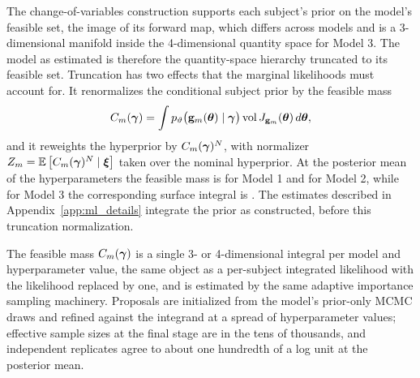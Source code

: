 The change-of-variables construction supports each subject's prior on
the model's feasible set, the image of its forward map, which differs
across models and is a 3-dimensional manifold inside the 4-dimensional
quantity space for Model 3. The model as estimated is therefore the
quantity-space hierarchy truncated to its feasible set. Truncation has
two effects that the marginal likelihoods must account for. It
renormalizes the conditional subject prior by the feasible mass
\begin{equation}
  \label{eq:feasible_mass}
  C_m(\boldsymbol{\gamma}) = \int p_{\vartheta}\big(\mathbf{g}_m(\boldsymbol{\theta}) \mid \boldsymbol{\gamma}\big)\,
    \mathrm{vol}\, J_{\mathbf{g}_m}(\boldsymbol{\theta})\, d\boldsymbol{\theta},
\end{equation}
and it reweights the hyperprior by $C_m(\boldsymbol{\gamma})^N$, with normalizer
$Z_m = \mathbb{E}\left[C_m(\boldsymbol{\gamma})^N \mid \boldsymbol{\xi}\right]$ taken over the nominal
hyperprior. At the posterior mean of the hyperparameters the feasible
mass is  for Model 1 and
 for Model 2, while for
Model 3 the corresponding surface integral is
. The estimates described
in Appendix~\ref{app:ml_details} integrate the prior as constructed,
before this truncation normalization.

The feasible mass $C_m(\boldsymbol{\gamma})$ is a
single 3- or 4-dimensional integral per model and hyperparameter value,
the same object as a per-subject integrated likelihood with the
likelihood replaced by one, and is estimated by the same adaptive
importance sampling machinery. Proposals are initialized from the
model's prior-only MCMC draws and refined against the integrand at a
spread of hyperparameter values; effective sample sizes at the final
stage are in the tens of thousands, and independent replicates agree to
about one hundredth of a log unit at the posterior mean.

